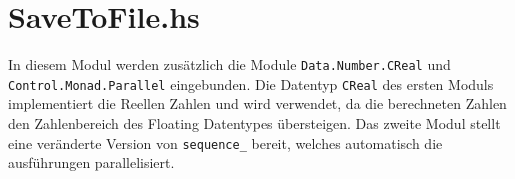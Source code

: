 \begin{comment}
\begin{align*}
v(t)&=
  \frac{1}{2}t^{-1}+
  \frac{3}{4}it^{0}+
  \frac{3}{2}t^{1}+
  \frac{-63}{16}it^{2}+
  \frac{-27}{2}t^{3}+
  \frac{1899}{32}it^{4}+
  \frac{324}{1}t^{5}+
  \frac{-543483}{256}it^{6}+
\\&\qquad\frac{-32427}{2}t^{7}+
  \frac{72251109}{512}it^{8}+
  \frac{2752623}{2}t^{9}+
  \frac{-30413055339}{2048}it^{10}+
  \frac{-175490226}{1}t^{11}+
\\&\qquad\frac{9228545313147}{4096}it^{12}+
  \frac{31217145174}{1}t^{13}+
  \frac{-30419533530730323}{65536}it^{14}+
\\&\qquad\frac{-14741904895227}{2}t^{15}+
  \frac{16317191917079376129}{131072}it^{16}+
  \frac{4456057685561073}{2}t^{17}+
\\&\qquad\frac{-22082325223708363779009}{524288}it^{18}+
  \frac{-1677161966915352627}{2}t^{19}+
\\&\qquad\frac{18391039987731669876160557}{1048576}it^{20}+
  \frac{384452768592440499024}{1}t^{21}+
\\&\qquad\frac{-73930258776609869550094166319}{8388608}it^{22}+
  \frac{-210878717949731493002826}{1}t^{23}+
\\&\qquad\frac{88204980719873920964105544038937}{16777216}it^{24}+
  \frac{136346686011011135869054074}{1}t^{25}+
\\&\qquad\frac{-246474684300724210330466557670749827}{67108864}it^{26}+
\\&\qquad\frac{-102614997677451303311734530276}{1}t^{27}+
\\&\qquad\frac{398608966820777951112056743321778108571}{134217728}it^{28}+
\\&\qquad\frac{88929857099067937229443324337874}{1}t^{29}+
\\&\qquad\frac{-11819876688678190917510659802435441505814403}{4294967296}it^{30}+
  \dots
\end{align*}
\end{comment}

\section{SaveToFile.hs}


In diesem Modul werden zusätzlich die Module \texttt{Data.Number.CReal} und
\texttt{Control.Monad.Parallel} eingebunden.
Die Datentyp \texttt{CReal} des ersten Moduls implementiert die Reellen Zahlen
und wird verwendet, da die berechneten Zahlen den Zahlenbereich des Floating
Datentypes übersteigen.
Das zweite Modul stellt eine veränderte Version von \texttt{sequence\_} bereit,
welches automatisch die ausführungen parallelisiert.
\begin{comment}
Beide Pakete lassen sich mittels dem Cabal Befehl
\begin{lstlisting}[style=Bash]
cabal install numbers monad-parallel
\end{lstlisting}
installieren
\end{comment}

